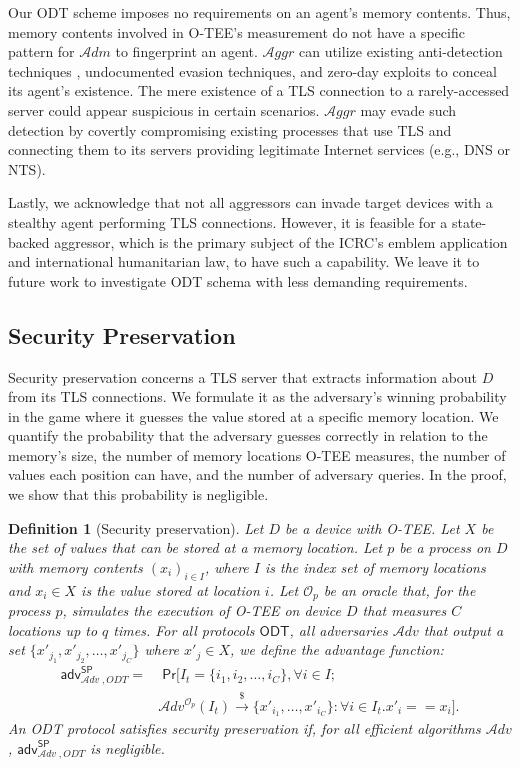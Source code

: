 \documentclass[letterpaper,twocolumn,10pt]{article}
\newcommand{\T}{\ensuremath{\mathcal{A}ggr}\xspace}
\newcommand{\ADM}{\ensuremath{\mathcal{A}dm}\xspace}
\newcommand{\alg}[1]{\mathsf{#1}}
\newcommand{\adv}{\mathcal{A}dv}
\newcommand{\PR}{\mathsf{Pr}}
\newcommand{\riar}{\xrightarrow{\$}}
\newcommand{\OO}{\mathcal{O}}
\newcommand{\advantage}[2]{\alg{adv}^{#1}_{\adv\;\!,#2}}
\newtheorem{definition}{Definition}
\begin{document}
Our ODT scheme imposes no requirements on an agent's memory contents. Thus, memory contents involved in O-TEE's measurement do not have a specific pattern for \ADM to fingerprint an agent.
\T can utilize existing anti-detection techniques  \cite{ANSB19}, undocumented evasion techniques, and zero-day exploits to conceal its agent's existence. The mere existence of a TLS connection to a rarely-accessed server could appear suspicious in certain scenarios. \T may evade such detection by covertly compromising existing processes that use TLS and connecting them to its servers providing legitimate Internet services (e.g., DNS or NTS).

Lastly, we acknowledge that not all aggressors can invade target devices with a stealthy agent performing TLS connections. However, it is feasible for a state-backed aggressor, which is the primary subject of the ICRC's emblem application and international humanitarian law, to have such a capability.
We leave it to future work to investigate ODT schema with less demanding requirements.

\subsection{Security Preservation}
\label{sec:sec-preservation}
Security preservation concerns a TLS server that extracts information about $D$ from its TLS connections. We formulate it as the adversary's winning probability in the game where it guesses the value stored at a specific memory location.
We quantify the probability that the adversary guesses correctly in relation to the memory's size, the number of memory locations O-TEE measures, the number of values each position can have, and the number of adversary queries.
In the proof, we show that this probability is negligible.

\begin{definition}[Security preservation]
\label{def:sec-preservation}
  Let $D$ be a device with O-TEE. Let $X$ be the set of values that can be stored at a memory location.
   Let $p$ be a process on $D$ with memory contents $(x_i)_{i \in I}$, where $I$ is the index set of memory locations and $x_i \in X$ is the value stored at location $i$.
  Let $\OO_p$ be an oracle that, for the process $p$, simulates the execution of O-TEE on device $D$ that measures $C$ locations up to $q$ times.
  For all protocols $\mathsf{ODT}$, all adversaries $\adv$ that output a set $\{ x'_{j_1}, x'_{j_2}, \dots, x'_{j_C} \}$ where $x'_j \in X$, we define the advantage function:
  \begin{equation*}
    \begin{split}
      \advantage{\mathsf{SP}}{\mathit{ODT}} = & \;
      \PR[ I_t = \{i_1, i_2, \dots, i_C\}, \forall i \in I; \\
      & \adv^{\OO_p}(I_t) \riar \{ x'_{i_1}, \dots, x'_{i_C} \} : \forall i \in I_t. x'_i == x_i ].
    \end{split}
  \end{equation*}
An ODT protocol satisfies security preservation if, for
  all efficient algorithms $\adv$, $\advantage{\mathsf{SP}}{\mathit{ODT}}$ is negligible.
\end{definition}
\end{document}
